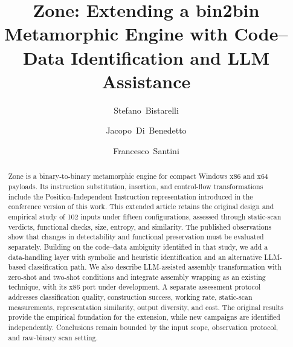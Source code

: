 \documentclass[runningheads]{llncs}
\newif\ifworkingdraft
\newcommand{\draftnote}[1]{\ifworkingdraft\par\smallskip\noindent
 {\color{draftblue}\small\textbf{Draft note.} #1}\par\smallskip\fi}
\begin{document}
\title{Zone: Extending a bin2bin Metamorphic Engine with Code--Data Identification and LLM Assistance}
\author{Stefano~Bistarelli \and
Jacopo~Di~Benedetto \and
Francesco~Santini}
\maketitle

\begin{abstract}
Zone is a binary-to-binary metamorphic engine for compact Windows x86
and x64 payloads. Its instruction substitution, insertion, and
control-flow transformations include the Position-Independent Instruction
representation introduced in the conference version of this work.
This extended article retains the original design and empirical study
of 102 inputs under fifteen configurations, assessed through static-scan
verdicts, functional checks, size, entropy, and similarity. The published
observations show that changes in detectability and functional
preservation must be evaluated separately. Building on the code--data
ambiguity identified in that study, we add a data-handling layer with
symbolic and heuristic identification and an alternative LLM-based
classification path. We also describe LLM-assisted assembly
transformation with zero-shot and two-shot conditions and integrate
assembly wrapping as an existing technique, with its x86 port under
development. A separate assessment protocol addresses classification
quality, construction success, working rate, static-scan measurements,
representation similarity, output diversity, and cost. The original
results provide the empirical foundation for the extension, while new
campaigns are identified independently. Conclusions remain bounded by
the input scope, observation protocol, and raw-binary scan setting.
\end{abstract}
\draftnote{The original study and its detailed results are retained.
Additional experiments are in progress; their numerical results remain
pending. The x86 wrapping port is development work. Update the abstract
and conclusions with the verified extension findings before submission.}
\end{document}
